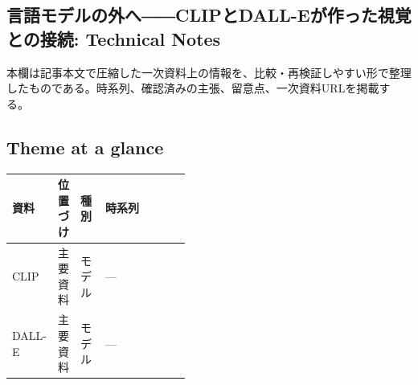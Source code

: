 \subsection*{言語モデルの外へ――CLIPとDALL-Eが作った視覚との接続: Technical Notes}
本欄は記事本文で圧縮した一次資料上の情報を、比較・再検証しやすい形で整理したものである。時系列、確認済みの主張、留意点、一次資料URLを掲載する。
\medskip
\subsection*{Theme at a glance}
\begin{center}
\footnotesize
\begin{tabularx}{\linewidth}{@{}p{0.20\linewidth}p{0.10\linewidth}p{0.14\linewidth}X@{}}
\toprule
資料 & 位置づけ & 種別 & 時系列 \\
\midrule
CLIP & 主要資料 & モデル & — \\
DALL-E & 主要資料 & モデル & — \\
\bottomrule
\end{tabularx}
\end{center}
\normalsize

